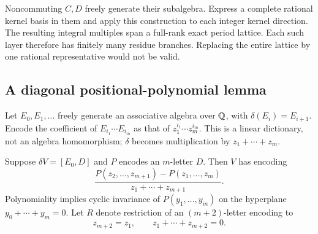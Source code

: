 Noncommuting $C,D$ freely generate their subalgebra. Express a complete
rational kernel basis in them and apply this construction to each
integer kernel direction. The resulting integral multiples span a
full-rank exact period lattice. Each such layer therefore has finitely
many residue branches. Replacing the entire lattice by one rational
representative would not be valid.

\subsection{A diagonal positional-polynomial lemma}\label{app:positional}
Let $E_0,E_1,\ldots$ freely generate an associative algebra over $\mathbb Q$,
with $\delta(E_i)=E_{i+1}$. Encode the coefficient of
$E_{i_1}\cdots E_{i_m}$ as that of $z_1^{i_1}\cdots z_m^{i_m}$.
This is a linear dictionary, not an algebra homomorphism; $\delta$
becomes multiplication by $z_1+\cdots+z_m$.

Suppose $\delta V=[E_0,D]$ and $P$ encodes an $m$-letter $D$.
Then $V$ has encoding
\begin{equation}\label{eq:positional-quotient}
 \frac{P(z_2,\ldots,z_{m+1})-P(z_1,\ldots,z_m)}
 {z_1+\cdots+z_{m+1}}.
\end{equation}
Polynomiality implies cyclic invariance of $P(y_1,\ldots,y_m)$
on the hyperplane $y_0+\cdots+y_m=0$. Let $R$ denote restriction
of an $(m+2)$-letter encoding to
\[
 z_{m+2}=z_1,\qquad z_1+\cdots+z_{m+2}=0.
\]

